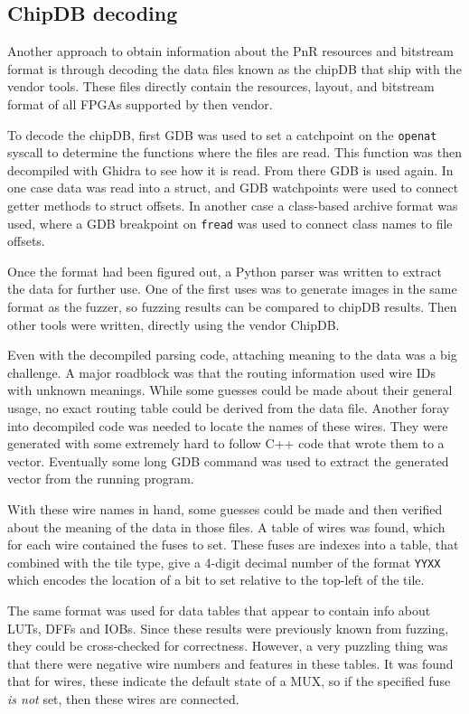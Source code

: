 \documentclass{article}
\begin{document}
\subsection{ChipDB decoding}\label{sec:chipdb}

Another approach to obtain information about the PnR resources and bitstream format is through decoding the data files known as the chipDB that ship with the vendor tools. These files directly contain the resources, layout, and bitstream format of all FPGAs supported by then vendor. 

To decode the chipDB, first GDB was used to set a catchpoint on the \texttt{openat} syscall to determine the functions where the files are read. This function was then decompiled with Ghidra to see how it is read. From there GDB is used again. In one case data was read into a struct, and GDB watchpoints were used to connect getter methods to struct offsets. In another case a class-based archive format was used, where a GDB breakpoint on \texttt{fread} was used to connect class names to file offsets.

Once the format had been figured out, a Python parser was written to extract the data for further use. One of the first uses was to generate images in the same format as the fuzzer, so fuzzing results can be compared to chipDB results. Then other tools were written, directly using the vendor ChipDB.

Even with the decompiled parsing code, attaching meaning to the data was a big challenge. A major roadblock was that the routing information used wire IDs with unknown meanings. While some guesses could be made about their general usage, no exact routing table could be derived from the data file. Another foray into decompiled code was needed to locate the names of these wires. They were generated with some extremely hard to follow C++ code that wrote them to a vector. Eventually some long GDB command was used to extract the generated vector from the running program.

With these wire names in hand, some guesses could be made and then verified about the meaning of the data in those files. A table of wires was found, which for each wire contained the fuses to set. These fuses are indexes into a table, that combined with the tile type, give a 4-digit decimal number of the format \texttt{YYXX} which encodes the location of a bit to set relative to the top-left of the tile.

The same format was used for data tables that appear to contain info about LUTs, DFFs and IOBs. Since these results were previously known from fuzzing, they could be cross-checked for correctness. However, a very puzzling thing was that there were negative wire numbers and features in these tables. It was found that for wires, these indicate the default state of a MUX, so if the specified fuse \textit{is not} set, then these wires are connected.
\end{document}
